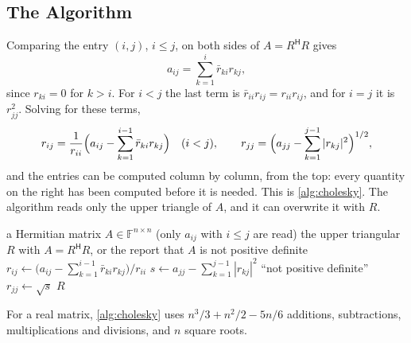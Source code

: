 \subsection{The Algorithm}

Comparing the entry $(i,j)$, $i\le j$, on both sides of $A=R^{\mathsf H}R$ gives
\[
a_{ij}=\sum_{k=1}^{i}\bar r_{ki}r_{kj},
\]
since $r_{ki}=0$ for $k>i$. For $i<j$ the last term is $\bar r_{ii}r_{ij}=r_{ii}r_{ij}$, and for $i=j$ it is $r_{jj}^2$. Solving for these terms,
\begin{equation}
r_{ij}=\frac1{r_{ii}}\Bigl(a_{ij}-\sum_{k=1}^{i-1}\bar r_{ki}r_{kj}\Bigr)\quad(i<j),\qquad r_{jj}=\Bigl(a_{jj}-\sum_{k=1}^{j-1}|r_{kj}|^2\Bigr)^{1/2},
\label{eq:cholesky-entries}
\end{equation}
and the entries can be computed column by column, from the top: every quantity on the right has been computed before it is needed. This is \cref{alg:cholesky}. The algorithm reads only the upper triangle of $A$, and it can overwrite it with $R$.

\begin{algorithm}
\begin{algorithmic}[1]
\Require a Hermitian matrix $A\in\mathbb F^{n\times n}$ (only $a_{ij}$ with $i\le j$ are read)
\Ensure the upper triangular $R$ with $A=R^{\mathsf H}R$, or the report that $A$ is not positive definite
    \State $r_{ij}\gets\bigl(a_{ij}-\sum_{k=1}^{i-1}\bar r_{ki}r_{kj}\bigr)/r_{ii}$
  \EndFor
  \State $s\gets a_{jj}-\sum_{k=1}^{j-1}|r_{kj}|^2$ 
    \State \Return ``not positive definite'' 
  \EndIf
  \State $r_{jj}\gets\sqrt s$
\EndFor
\State \Return $R$
\end{algorithmic}
\caption{The Cholesky factorisation, column by column (\cref{thm:cholesky,prop:cholesky-test}). It uses $n^3/3+n^2/2-5n/6$ arithmetic operations and $n$ square roots for a real matrix; the entries below the diagonal of $R$ are zero and are neither computed nor stored.}
\label{alg:cholesky}
\end{algorithm}

\begin{proposition}
\label{prop:cholesky-cost}
For a real matrix, \cref{alg:cholesky} uses $n^3/3+n^2/2-5n/6$ additions, subtractions, multiplications and divisions, and $n$ square roots.
\end{proposition}

